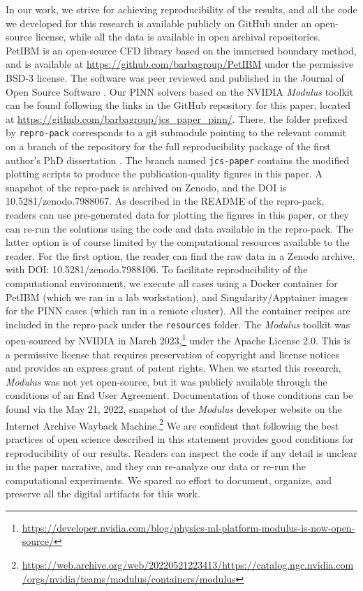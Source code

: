 
In our work, we strive for achieving reproducibility of the results, and all the code we developed for this research is available publicly on GitHub under an open-source license, while all the data is available in open archival repositories.
PetIBM is an open-source CFD library based on the immersed boundary method, and is available at \url{https://github.com/barbagroup/PetIBM} under the permissive BSD-3 license. 
The software was peer reviewed and published in the Journal of Open Source Software \cite{chuang_petibm_2018}. 
Our PINN solvers based on the NVIDIA \emph{Modulus} toolkit can be found following the links in the GitHub repository for this paper, located at \url{https://github.com/barbagroup/jcs_paper_pinn/}. 
There, the folder prefixed by \texttt{repro-pack} corresponds to a git submodule pointing to the relevant commit on a branch of the repository for the full reproducibility package of the first author's PhD dissertation \cite{chuang_thesis_2023}.
The branch named \texttt{jcs-paper} contains the modified plotting scripts to produce the publication-quality figures in this paper.    
A snapshot of the repro-pack is archived on Zenodo, and the DOI is 10.5281/zenodo.7988067.
As described in the README of the repro-pack, readers can use pre-generated data for plotting the figures in this paper, or they can re-run the solutions using the code and data available in the repro-pack.
The latter option is of course limited by the computational resources available to the reader.
For the first option, the reader can find the raw data in a Zenodo archive, with DOI: 10.5281/zenodo.7988106.
To facilitate reproducibility of the computational environment, we execute all cases using a Docker container for PetIBM (which we ran in a lab workstation), and Singularity/Apptainer images for the PINN cases (which ran in a remote cluster). 
All the container recipes are included in the repro-pack under the \texttt{resources} folder. 
The \emph{Modulus} toolkit was open-sourced by NVIDIA in March 2023,\footnote{\url{https://developer.nvidia.com/blog/physics-ml-platform-modulus-is-now-open-source/}} under the Apache License 2.0.
This is a permissive license that requires preservation of copyright and license notices and provides an express grant of patent rights. 
When we started this research, \emph{Modulus} was not yet open-source, but it was publicly available through the conditions of an End User Agreement. 
Documentation of those conditions can be found via the May 21, 2022, snapshot of the \emph{Modulus} developer website on the Internet Archive Wayback Machine.\footnote{\url{https://web.archive.org/web/20220521223413/https://catalog.ngc.nvidia.com/orgs/nvidia/teams/modulus/containers/modulus}}
We are confident that following the best practices of open science described in this statement provides good conditions for reproducibility of our results. 
Readers can inspect the code if any detail is unclear in the paper narrative, and they can re-analyze our data or re-run the computational experiments.
We spared no effort to document, organize, and preserve all the digital artifacts for this work.